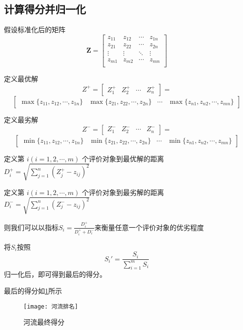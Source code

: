 \documentclass[withoutpreface]{cumcmthesis}
\begin{document}
    \subsection{计算得分并归一化}

    假设标准化后的矩阵
    $$\mathbf{Z}=\begin{bmatrix}
        z_{11} & z_{12} & \cdots & z_{1n} \\ 
        z_{21} & z_{22} & \cdots & z_{2n} \\
        \vdots & \vdots & \ddots & \vdots \\ 
        z_{m1} & z_{m2} & \cdots & z_{mn} \\
    \end{bmatrix}$$

    定义最优解$$Z^+ 
    =\begin{bmatrix} Z_1^+ & Z_2^+ & \cdots & Z_n^+\end{bmatrix}=
    $$
    $$
    \begin{bmatrix} \max\{z_{11},z_{12},\cdots,z_{1n}\} & \max\{z_{21},z_{22},\cdots,z_{2n}\} & \cdots & \max\{z_{n1},z_{n2},\cdots,z_{mn}\}\end{bmatrix}$$

    定义最劣解$$Z^- 
    =\begin{bmatrix} Z_1^- & Z_2^- & \cdots & Z_n^-\end{bmatrix}=
    $$
    $$
    \begin{bmatrix} \min\{z_{11},z_{12},\cdots,z_{1n}\} & \min\{z_{21},z_{22},\cdots,z_{2n}\} & \cdots & \min\{z_{n1},z_{n2},\cdots,z_{mn}\}\end{bmatrix}$$

    定义第 $i(i=1,2,\cdots,m)$ 个评价对象到最优解的距离 $D_i^+=\sqrt{\sum\limits_{j=1}^{n}(Z_j^+-z_{ij})^2}$

    定义第 $i(i=1,2,\cdots,m)$ 个评价对象到最劣解的距离 $D_i^-=\sqrt{\sum\limits_{j=1}^{n}(Z_j^--z_{ij})^2}$

    则我们可以以指标$\displaystyle S_i=\frac{D_i^+}{D_i^++D_i^-}$来衡量任意一个评价对象的优劣程度

    将$S_i$按照$$S_i'=\frac{S_i}{\sum\limits_{i=1}^{m}S_i}$$归一化后，即可得到最后的得分。

    最后的得分如\cref{Fig:1}所示

    \begin{figure}[H]
        \centering
        \texttt{[image: 河流排名]}
        \caption{河流最终得分}\label{Fig:1}
    \end{figure}
\end{document}

